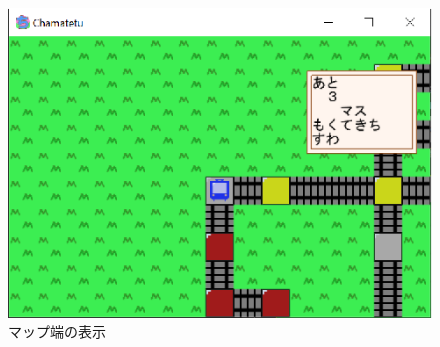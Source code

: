 \documentclass[a4j]{jarticle}
\begin{document}
    \begin{figure}[H]
        \centering
        \includegraphics[scale=1.3]{maplay3.eps}
        \caption{マップ端の表示}
         \label{mapplay3}
        \end{figure} 
    
\end{document}
